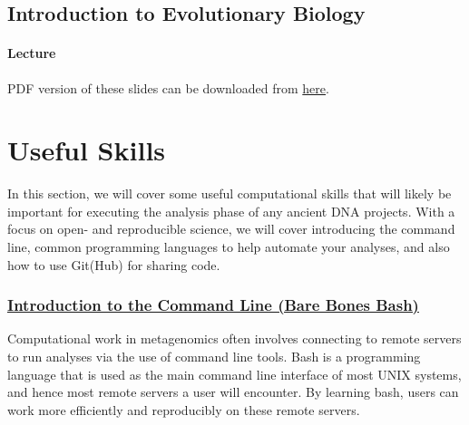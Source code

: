 \documentclass[
  letterpaper,
]{book}
\begin{document}
\hypertarget{introduction-to-evolutionary-biology-1}{%
\chapter{Introduction to Evolutionary
Biology}\label{introduction-to-evolutionary-biology-1}}

\hypertarget{lecture-4}{%
\subsection{Lecture}\label{lecture-4}}

PDF version of these slides can be downloaded from
\href{https://github.com/SPAAM-community/wss-summer-school/raw/main/docs/assets/slides/2022/5a-intro-to-evobio/SPAAM\%20Summer\%20School\%202022\%20-\%205A\%20-\%20Evolutionary\%20Biology\%20and\%20Phylogenetics.pdf}{here}.

\part{Useful Skills}

In this section, we will cover some useful computational skills that
will likely be important for executing the analysis phase of any ancient
DNA projects. With a focus on open- and reproducible science, we will
cover introducing the command line, common programming languages to help
automate your analyses, and also how to use Git(Hub) for sharing code.

\hypertarget{introduction-to-the-command-line-bare-bones-bash}{%
\section*{\texorpdfstring{\protect\hyperlink{introduction-to-the-command-line}{Introduction
to the Command Line (Bare Bones
Bash)}}{Introduction to the Command Line (Bare Bones Bash)}}\label{introduction-to-the-command-line-bare-bones-bash}}


Computational work in metagenomics often involves connecting to remote
servers to run analyses via the use of command line tools. Bash is a
programming language that is used as the main command line interface of
most UNIX systems, and hence most remote servers a user will encounter.
By learning bash, users can work more efficiently and reproducibly on
these remote servers.
\end{document}
